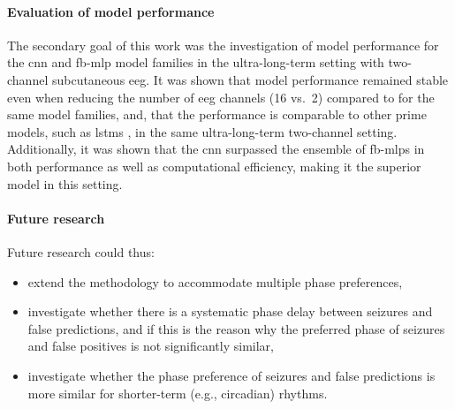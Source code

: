 \paragraph{Evaluation of model performance} 
The secondary goal of this work was the investigation of model performance for the \gls{cnn} and \gls{fb-mlp} model families in the ultra-long-term setting with two-channel subcutaneous \gls{eeg}.
It was shown that model performance remained stable even when reducing the number of \gls{eeg} channels (16 vs.\ 2) compared to \textcite{muller_coherent_2022} for the same model families, and, that the performance is comparable to other prime models, such as \glspl{lstm} \parencite{viana_seizure_2023}, in the same ultra-long-term two-channel setting.
Additionally, it was shown that the \gls{cnn} surpassed the ensemble of \glspl{fb-mlp} in both performance as well as computational efficiency, making it the superior model in this setting. 


\paragraph{Future research} 
Future research could thus:
\begin{itemize}
    \item extend the methodology to accommodate multiple phase preferences, 
    \item investigate whether there is a systematic phase delay between seizures and false predictions, and if this is the reason why the preferred phase of seizures and false positives is not significantly similar,
    \item investigate whether the phase preference of seizures and false predictions is more similar for shorter-term (e.g., circadian) rhythms.
\end{itemize}
